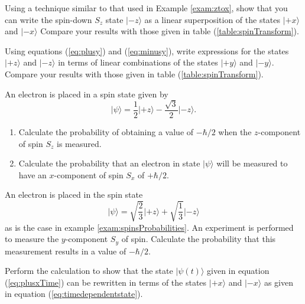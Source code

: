 \begin{problem}
Using a technique similar to that  used in Example \ref{exam:ztox}, show that you can write the spin-down $S_z$ state $\vert\mbox{$-z$}\rangle$ as a linear superposition of the states $\vert\mbox{$+x$}\rangle$ and $\vert\mbox{$-x$}\rangle$ Compare your results with those given in table (\ref{table:spinTransform}).
\end{problem}

\begin{problem}
Using equations (\ref{eq:plusy}) and (\ref{eq:minusy}), write expressions for the states $\vert\mbox{$+z$}\rangle$ and $\vert\mbox{$-z$}\rangle$ in terms of linear combinations of the states $\vert\mbox{$+y$}\rangle$ and $\vert\mbox{$-y$}\rangle$.  Compare your results with those given in table (\ref{table:spinTransform}).
\end{problem}

\begin{problem}
An electron is placed in a spin state given by
\[ \vert\mbox{$\psi$}\rangle = \frac{1}{2}\vert\mbox{$+z$}\rangle -\frac{\sqrt{3}}{2}\vert\mbox{$-z$}\rangle .\]
\begin{enumerate}
\item Calculate the probability of obtaining a value of $-\hbar/2$ when the $z$-component of spin $S_z$ is measured.
\item Calculate the probability that an electron in state $\vert\mbox{$\psi$}\rangle$ will be measured to have an $x$-component of spin $S_x$ of $+\hbar/2$.
\end{enumerate}
\end{problem}

\begin{problem}
An electron is placed in the spin state
\[ \vert\mbox{$\psi$}\rangle = \sqrt{\frac{2}{3}}\vert\mbox{$+z$}\rangle +\sqrt{\frac{1}{3}}\vert\mbox{$-z$}\rangle \]
as is the case in example \ref{exam:spinsProbabilities}. An experiment is performed to measure the $y$-component $S_y$ of spin.  Calculate the probability that this measurement results in a value of $-\hbar/2$.
\end{problem}

\begin{problem}
Perform the calculation to show that the state $\vert\mbox{$\psi(t)$}\rangle$ given in equation (\ref{eq:plusxTime}) can be rewritten in terms of the states $\vert\mbox{$+x$}\rangle$ and $\vert\mbox{$-x$}\rangle$ as given in equation (\ref{eq:timedependentstate}).
\end{problem}

